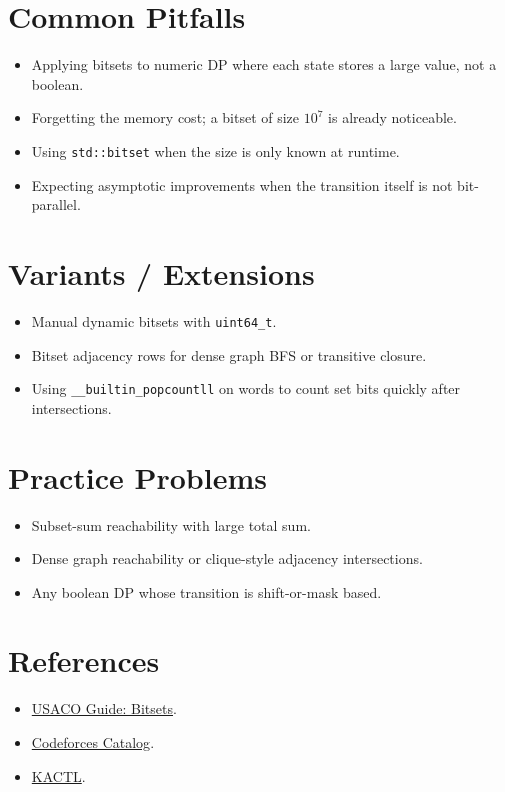 \section*{Common Pitfalls}

\begin{itemize}
  \item Applying bitsets to numeric DP where each state stores a large value, not a boolean.
  \item Forgetting the memory cost; a bitset of size \(10^7\) is already noticeable.
  \item Using \texttt{std::bitset} when the size is only known at runtime.
  \item Expecting asymptotic improvements when the transition itself is not bit-parallel.
\end{itemize}

\section*{Variants / Extensions}

\begin{itemize}
  \item Manual dynamic bitsets with \texttt{uint64\_t}.
  \item Bitset adjacency rows for dense graph BFS or transitive closure.
  \item Using \texttt{\_\_builtin\_popcountll} on words to count set bits quickly after intersections.
\end{itemize}

\section*{Practice Problems}

\begin{itemize}
  \item Subset-sum reachability with large total sum.
  \item Dense graph reachability or clique-style adjacency intersections.
  \item Any boolean DP whose transition is shift-or-mask based.
\end{itemize}

\section*{References}

\begin{itemize}
  \item \href{https://usaco.guide/plat/bitsets}{USACO Guide: Bitsets}.
  \item \href{https://codeforces.com/catalog}{Codeforces Catalog}.
  \item \href{https://github.com/kth-competitive-programming/kactl}{KACTL}.
\end{itemize}
